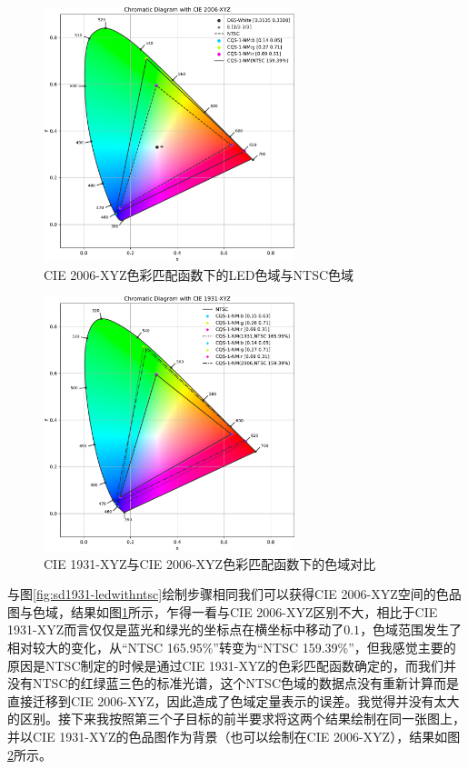 \begin{figure}[htbp]
    \centering
    \includegraphics[width=0.65\textwidth]{./imgs/sec4/CQS-1-NM-2006-sd.pdf}
    \caption{CIE 2006-XYZ色彩匹配函数下的LED色域与NTSC色域}
    \label{fig:sd2006-ledwithntsc}
\end{figure}

\begin{figure}[htbp]
    \centering
    \includegraphics[width=0.65\textwidth]{./imgs/sec4/CQS-1-NM-cmparea-sd.pdf}
    \caption{CIE 1931-XYZ与CIE 2006-XYZ色彩匹配函数下的色域对比}
    \label{fig:sd1931vs2006}
\end{figure}

与图\ref{fig:sd1931-ledwithntsc}绘制步骤相同我们可以获得CIE 2006-XYZ空间的色品图与色域，结果如图\ref{fig:sd2006-ledwithntsc}所示，乍得一看与CIE 2006-XYZ区别不大，相比于CIE 1931-XYZ而言仅仅是蓝光和绿光的坐标点在横坐标中移动了$0.1$，色域范围发生了相对较大的变化，从``NTSC 165.95\%''转变为``NTSC 159.39\%''，但我感觉主要的原因是NTSC制定的时候是通过CIE 1931-XYZ的色彩匹配函数确定的，而我们并没有NTSC的红绿蓝三色的标准光谱，这个NTSC色域的数据点没有重新计算而是直接迁移到CIE 2006-XYZ，因此造成了色域定量表示的误差。我觉得并没有太大的区别。接下来我按照第三个子目标的前半要求将这两个结果绘制在同一张图上，并以CIE 1931-XYZ的色品图作为背景（也可以绘制在CIE 2006-XYZ），结果如图\ref{fig:sd1931vs2006}所示。

